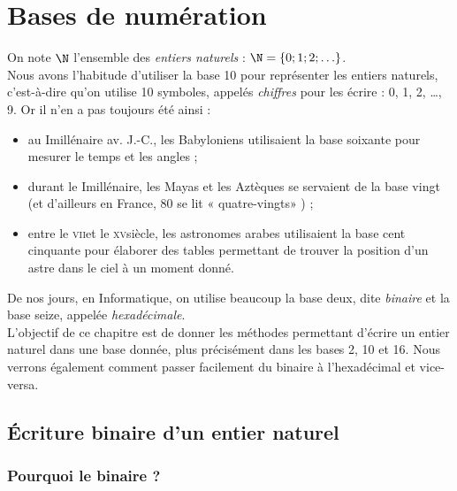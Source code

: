 \chapter{Bases de numération}


On note $\N$ l'ensemble des \textit{entiers naturels} : $\N=\lbrace 0;1;2;\ldots\rbrace$.\\

Nous avons l'habitude d'utiliser la base 10 pour représenter les entiers naturels, c'est-à-dire qu'on utilise 10 symboles, appelés \textit{chiffres}
pour les écrire : 0, 1, 2, \ldots, 9.
Or il n'en a pas toujours été ainsi :
\begin{itemize}
    \item 	au \textsc{I}\er millénaire av. J.-C., les Babyloniens utilisaient la base soixante pour mesurer le temps et les angles ;
    \item 	durant le \textsc{I}\er millénaire, les Mayas et les Aztèques se servaient de la base vingt (et d'ailleurs en France, 80 se lit «
          quatre-vingts» ) ;
    \item 	entre le \textsc{vii}\eme et le \textsc{xv}\eme siècle, les astronomes arabes utilisaient la base cent cinquante pour élaborer des tables
          permettant de trouver la position d'un astre dans le ciel à un moment donné.
\end{itemize}
De nos jours, en Informatique, on utilise beaucoup la base deux, dite \textit{binaire} et la base seize, appelée \textit{hexadécimale}.\\
L'objectif de ce chapitre est de donner les méthodes permettant d'écrire un entier naturel dans une base donnée, plus précisément dans les bases 2,
10 et 16. Nous verrons également comment passer facilement du binaire à l'hexadécimal et vice-versa.

\section{\'Ecriture binaire d'un entier naturel}
\subsection{Pourquoi le binaire ?}



